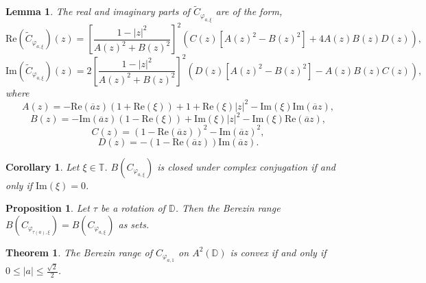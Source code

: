 \documentclass[10pt,a4paper]{amsart}
\newtheorem{theorem}{Theorem}
\newtheorem{lemma}{Lemma}
\newtheorem{corollary}{Corollary}
\newtheorem{proposition}{Proposition}
\begin{document}
\begin{lemma}\label{ReImBerezinTransform}
The real and imaginary parts of $\widetilde{C}_{\varphi_{a,\xi}}$ are of the form,
\[\mathrm{Re}(\widetilde{C}_{\varphi_{a,\xi}})(z)=\left[\dfrac{1-|z|^2}{A(z)^2+B(z)^2}\right]^2\left(C(z)[A(z)^2-B(z)^2]+4A(z)B(z)D(z)\right),\]
\[\mathrm{Im}(\widetilde{C}_{\varphi_{a,\xi}})(z)=2 \left[\dfrac{1-|z|^2}{A(z)^2+B(z)^2}\right]^2(D(z)[A(z)^2-B(z)^2]-A(z)B(z)C(z)),\]
where
\[A(z)= -\mathrm{Re}(\overline{a}z)(1+\mathrm{Re}(\xi))+ 1 + \mathrm{Re}(\xi)|z|^2-\mathrm{Im}(\xi)\mathrm{Im}(\overline{a}z),\]
\[B(z)=-\mathrm{Im}(\overline{a}z)(1-\mathrm{Re}(\xi))+\mathrm{Im}(\xi)|z|^2-\mathrm{Im}(\xi)\mathrm{Re}(\overline{a}z),\]
\[C(z)=(1-\mathrm{Re}(\overline{a}z))^2-\mathrm{Im}(\overline{a}z)^2,\]
\[D(z)=-(1-\mathrm{Re}(\overline{a}z))\mathrm{Im}(\overline{a}z).\]
\end{lemma}    

\begin{corollary}\label{propconj}
Let $\xi \in \mathbb{T}$.  $B(C_{\varphi_{a,\xi}})$ is closed under complex conjugation if and only if $\mathrm{Im}(\xi) = 0$.
\end{corollary}

\begin{proposition}\label{auto_on_disk}
    Let $\tau$ be a rotation of $\mathbb{D}$.  Then the Berezin range $B(C_{\varphi_{\tau(a),\xi}})=B(C_{\varphi_{a,\xi}})$ as sets. 
\end{proposition}

\begin{theorem}\label{MainResultOneDimension}
The Berezin range of $C_{\varphi_{a,1}}$ on $A^2(\mathbb{D})$ is convex if and only if $0\leq|a| \leq \frac{\sqrt{2}}{2}$. 
\end{theorem}
\end{document}
